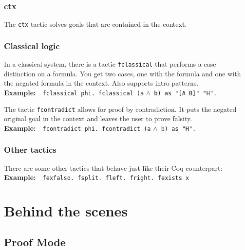 \documentclass[12pt, a4paper]{article}
\newcommand{\coq}[1]{\texttt{#1}}
\newcommand{\example}[1]{\medskip\\\textbf{Example:}~~#1}
\begin{document}
\subsubsection{\ttfamily ctx}

The \texttt{ctx} tactic solves goals that are contained in the context.


\subsubsection{Classical logic}

In a classical system, there is a tactic \texttt{fclassical} that performs a case distinction on a formula.
You get two cases, one with the formula and one with the negated formula in the context.
Also supports intro patterns.
\example{\coq{fclassical phi. fclassical (a} $\land$\coq{ b) as "[A B]" "H".}}

\medskip\noindent
The tactic \texttt{fcontradict} allows for proof by contradiction.
It puts the negated original goal in the context and leaves the user to prove falsity.
\example{\coq{fcontradict phi. fcontradict (a} $\land$\coq{ b) as "H".}}


\subsubsection{Other tactics}

There are some other tactics that behave just like their Coq counterpart:
\example{\coq{fexfalso. fsplit. fleft. fright. fexists x}}




\section{Behind the scenes}


\subsection{Proof Mode}
\end{document}
